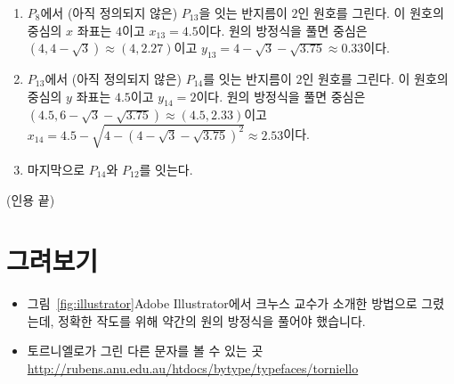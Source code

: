 \begin{enumerate}
\item $P_8$에서 (아직 정의되지 않은) $P_{13}$을 잇는 반지름이 $2$인
  원호를 그린다. 이 원호의 중심의 $x$ 좌표는 $4$이고 $x_{13}=
  4.5$이다. 원의 방정식을 풀면 중심은 $(4, 4-\sqrt3) \approx (4,
  2.27)$이고 $y_{13}=4-\sqrt{3}-\sqrt{3.75} \approx 0.33$이다. 

\item $P_{13}$에서 (아직 정의되지 않은) $P_{14}$를 잇는 반지름이 $2$인
  원호를 그린다. 이 원호의 중심의 $y$ 좌표는 $4.5$이고 $y_{14}=
  2$이다. 원의 방정식을 풀면 중심은 $(4.5, 6-\sqrt3-\sqrt{3.75}) \approx (4.5,
  2.33)$이고 $x_{14}=4.5-\sqrt{4-(4-\sqrt{3}-\sqrt{3.75})^2} \approx
  2.53$이다. 

\item 마지막으로 $P_{14}$와 $P_{12}$를 잇는다. 
\end{enumerate}

\bigskip
(인용 끝)


\section{그려보기}

\begin{itemize}

\item 그림~\ref{fig:illustrator}\은 \textsf{Adobe Illustrator}에서
  크누스 교수가 소개한 방법으로 그렸는데, 정확한 작도를 위해 약간의 원의 방정식을 풀어야 했습니다. 

\item 토르니엘로가 그린 다른  문자를 볼 수 있는 곳\\
	\url{http://rubens.anu.edu.au/htdocs/bytype/typefaces/torniello}

\end{itemize}

\begin{figure}
\end{figure}

\begin{figure}
\end{figure}
